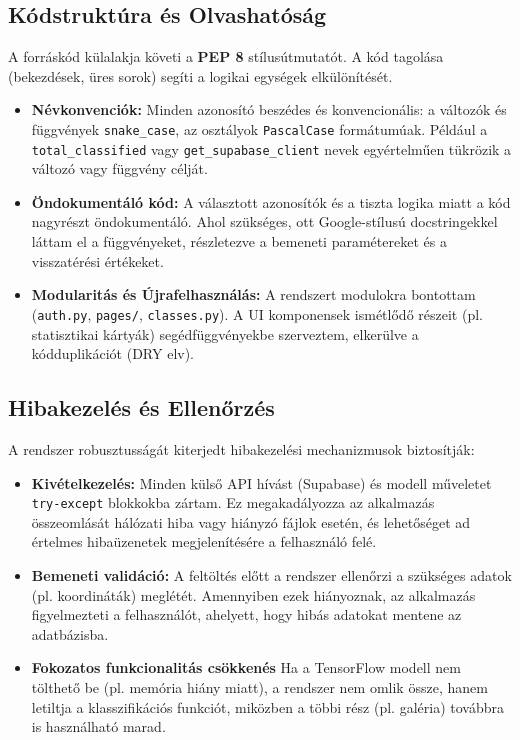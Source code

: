 \documentclass[
	parspace, %
]{elteikthesis}[2024/04/26]
\begin{document}
\subsection{Kódstruktúra és Olvashatóság}
A forráskód külalakja követi a \textbf{PEP 8} stílusútmutatót. A kód tagolása (bekezdések, üres sorok) segíti a logikai egységek elkülönítését.
\begin{itemize}
    \item \textbf{Névkonvenciók:} Minden azonosító beszédes és konvencionális: a változók és függvények \texttt{snake\_case}, az osztályok \texttt{PascalCase} formátumúak. Például a \texttt{total\_classified} vagy \texttt{get\_supabase\_client} nevek egyértelműen tükrözik a változó vagy függvény célját.
    \item \textbf{Öndokumentáló kód:} A választott azonosítók és a tiszta logika miatt a kód nagyrészt öndokumentáló. Ahol szükséges, ott Google-stílusú docstringekkel láttam el a függvényeket, részletezve a bemeneti paramétereket és a visszatérési értékeket.
    \item \textbf{Modularitás és Újrafelhasználás:} A rendszert modulokra bontottam (\texttt{auth.py}, \texttt{pages/}, \texttt{classes.py}). A UI komponensek ismétlődő részeit (pl. statisztikai kártyák) segédfüggvényekbe szerveztem, elkerülve a kódduplikációt (DRY elv).
\end{itemize}

\subsection{Hibakezelés és Ellenőrzés}
A rendszer robusztusságát kiterjedt hibakezelési mechanizmusok biztosítják:
\begin{itemize}
    \item \textbf{Kivételkezelés:} Minden külső API hívást (Supabase) és modell műveletet \texttt{try-except} blokkokba zártam. Ez megakadályozza az alkalmazás összeomlását hálózati hiba vagy hiányzó fájlok esetén, és lehetőséget ad értelmes hibaüzenetek megjelenítésére a felhasználó felé.
    \item \textbf{Bemeneti validáció:} A feltöltés előtt a rendszer ellenőrzi a szükséges adatok (pl. koordináták) meglétét. Amennyiben ezek hiányoznak, az alkalmazás figyelmezteti a felhasználót, ahelyett, hogy hibás adatokat mentene az adatbázisba.
    \item \textbf{Fokozatos funkcionalitás csökkenés} Ha a TensorFlow modell nem tölthető be (pl. memória hiány miatt), a rendszer nem omlik össze, hanem letiltja a klasszifikációs funkciót, miközben a többi rész (pl. galéria) továbbra is használható marad.
\end{itemize}
\end{document}
